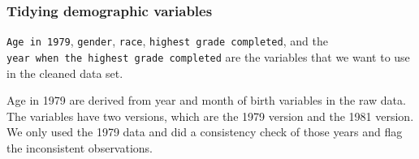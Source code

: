\documentclass{article}
\begin{document}
\hypertarget{tidying-demographic-variables}{%
\subsubsection{Tidying demographic variables}\label{tidying-demographic-variables}}

\texttt{Age\ in\ 1979}, \texttt{gender}, \texttt{race}, \texttt{highest\ grade\ completed}, and the \texttt{year\ when\ the\ highest\ grade\ completed} are the variables that we want to use in the cleaned data set.

Age in 1979 are derived from year and month of birth variables in the raw data. The variables have two versions, which are the 1979 version and the 1981 version. We only used the 1979 data and did a consistency check of those years and flag the inconsistent observations.
\end{document}
